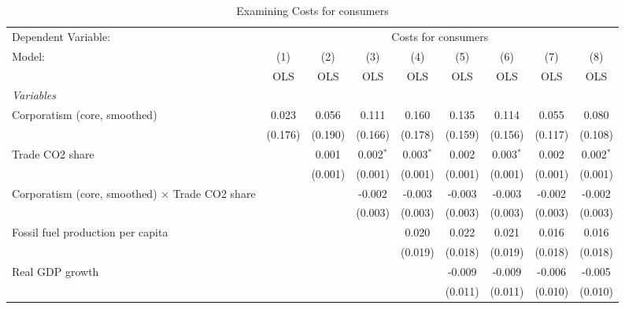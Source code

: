 
\begin{table}[htbp]
   \caption{Examining Costs for consumers}
   \centering
   \begin{tabular}{lcccccccc}
      \toprule
      Dependent Variable: & \multicolumn{8}{c}{Costs for consumers}\\
      Model:                                                 & (1)     & (2)     & (3)         & (4)         & (5)     & (6)         & (7)     & (8)\\  
                                                             &  OLS    & OLS     & OLS         & OLS         & OLS     & OLS         & OLS     & OLS\\  
      \midrule
      \emph{Variables}\\
      Corporatism (core, smoothed)                           & 0.023   & 0.056   & 0.111       & 0.160       & 0.135   & 0.114       & 0.055   & 0.080\\   
                                                             & (0.176) & (0.190) & (0.166)     & (0.178)     & (0.159) & (0.156)     & (0.117) & (0.108)\\   
      Trade CO2 share                                        &         & 0.001   & 0.002$^{*}$ & 0.003$^{*}$ & 0.002   & 0.003$^{*}$ & 0.002   & 0.002$^{*}$\\   
                                                             &         & (0.001) & (0.001)     & (0.001)     & (0.001) & (0.001)     & (0.001) & (0.001)\\   
      Corporatism (core, smoothed) $\times$ Trade CO2 share  &         &         & -0.002      & -0.003      & -0.003  & -0.003      & -0.002  & -0.002\\   
                                                             &         &         & (0.003)     & (0.003)     & (0.003) & (0.003)     & (0.003) & (0.003)\\   
      Fossil fuel production per capita                      &         &         &             & 0.020       & 0.022   & 0.021       & 0.016   & 0.016\\   
                                                             &         &         &             & (0.019)     & (0.018) & (0.019)     & (0.018) & (0.018)\\   
      Real GDP growth                                        &         &         &             &             & -0.009  & -0.009      & -0.006  & -0.005\\   
                                                             &         &         &             &             & (0.011) & (0.011)     & (0.010) & (0.010)\\   

\end{tabular}
\end{table}
